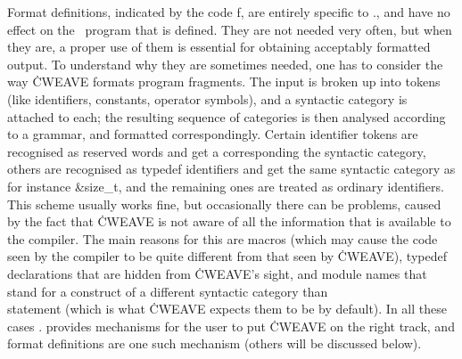 Format definitions, indicated by the code \:f, are entirely specific to
\CWEB., and have no effect on the \Cee~program that is defined. They are not
needed very often, but when they are, a proper use of them is essential for
obtaining acceptably formatted output. To understand why they are sometimes
needed, one has to consider the way \.{CWEAVE} formats program fragments.
The input is broken up into tokens (like identifiers, constants, operator
symbols), and a syntactic category is attached to each; the resulting
sequence of categories is then analysed according to a grammar, and formatted
correspondingly. Certain identifier tokens are recognised as reserved words
and get a corresponding the syntactic category, others are recognised as
typedef identifiers and get the same syntactic category as for instance
\&{size\_t}, and the remaining ones are treated as ordinary identifiers. This
scheme usually works fine, but occasionally there can be problems, caused by
the fact that \.{CWEAVE} is not aware of all the information that is
available to the compiler. The main reasons for this are macros (which may
cause the code seen by the compiler to be quite different from that seen by
\.{CWEAVE}), typedef declarations that are hidden from \.{CWEAVE}'s sight,
and module names that stand for a construct of a different syntactic
category than \\{statement} (which is what \.{CWEAVE} expects them to be by
default). In all these cases \CWEB. provides mechanisms for the user to put
\.{CWEAVE} on the right track, and format definitions are one such mechanism
(others will be discussed below).

